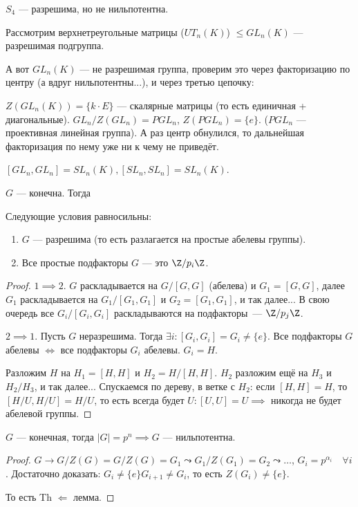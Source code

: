 \begin{example}
    $S_4$ --- разрешима, но не нильпотентна.
\end{example}
\begin{example}
	Рассмотрим верхнетреугольные матрицы ($UT_n(K)$) $\le GL_n(K)$  --- {\color{red} разрешимая} подгруппа.

    А вот $GL_n(K)$ --- не разрешимая группа, проверим это через факторизацию по центру (а вдруг нильпотентны...), и через третью цепочку:

    $Z(GL_n(K)) = \{k\cdot E\}$ --- скалярные матрицы (то есть единичная + диагональные).  $GL_n / Z(GL_n) = PGL_n$,  $Z(PGL_n) = \{e\}$. ($PGL_n$ --- проективная линейная группа). А раз центр обнулился, то дальнейшая факторизация по нему уже ни к чему не приведёт. 

     $[GL_n, GL_n] = SL_n(K), [SL_n, SL_n] = SL_n(K)$.
\end{example}
\begin{theorem}
    $G$ --- конечна. Тогда

    Следующие условия равносильны:
    \begin{enumerate}
        \item $G$ --- разрешима (то есть разлагается на простые абелевы группы).
        \item Все простые подфакторы $G$ --- это  $\Z / p_i \Z$.
    \end{enumerate}
\end{theorem}
\begin{proof}
    $1 \implies 2$. $G$ раскладывается на $G / [G, G]$ (абелева) и $G_1 = [G, G]$, далее $G_1$ раскладывается на $G_1 / [G_1, G_1]$ и $G_2 = [G_1, G_1]$, и так далее... В свою очередь все $G_i / [G_i, G_i]$ раскладываются на подфакторы~--- $\Z / p_j \Z$.

    $2 \implies 1$. Пусть $G$ неразрешима. Тогда  $\exists i\!: [G_i, G_i] = G_i \neq \{e\}$. Все подфакторы  $G$ абелевы  $\iff$ все подфакторы  $G_i$ абелевы.  $G_i = H$.

    Разложим  $H$ на $H_1 = [H, H]$ и $H_2 = H / [H, H]$. $H_2$ разложим ещё на $H_3$ и $H_2 / H_3$, и так далее... Спускаемся по дереву, в ветке с $H_2$: если $[H, H] = H$, то $[H / U, H / U] = H / U$, то есть всегда будет $U: [U, U] = U \implies$ никогда не будет абелевой группы.
\end{proof}
\begin{theorem}
    $G$ --- конечная, тогда  $|G| = p^n \implies G$ --- нильпотентна.
\end{theorem}
\begin{proof}
    $G \to G / Z(G) = G / Z(G) = G_1 \leadsto G_1 / Z(G_1) = G_2 \leadsto \ldots$, $G_i = p^{\alpha_i} \quad \forall i$. Достаточно доказать:  $G_i \neq \{e\} G_{i+1} \neq G_i$, то есть  $Z(G_i) \neq \{e\}$.

    То есть  Th  $\Leftarrow$  лемма.
\end{proof}
